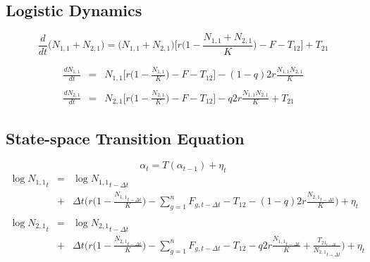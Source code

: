 \documentclass[a4paper,KOMA,landscape,titlepage]{powersem}
\newcommand\None{{N_{1,1}}}
\newcommand\Ntwo{{N_{2,1}}}
\newcommand\Nsum{{N_{1,1}+N_{2,1}}}
\begin{document}
\begin{slide}\section{Logistic Dynamics}
\begin{center}
\begin{equation}
\frac{d}{dt}\big(\Nsum\big)=\big(\Nsum\big)\Big[r\Big(1-\frac{\Nsum}{K}\Big)-F-T_{12}\Big]+T_{21}
\label{eqn:logistic}
\end{equation}
\vspace{2ex}

\begin{eqnarray}
\label{eqn:coupledschaeferq}
\frac{d\None}{dt}&=&\None\Big[r\Big(1-\frac{\None}{K}\Big)
-F - T_{12}\Big] - (1-q)2r\frac{\None\Ntwo}{K}\nonumber\\
\\
\frac{d\Ntwo}{dt}&=&\Ntwo\Big[r\Big(1-\frac{\Ntwo}{K}\Big)
-F - T_{12}\Big] - q2r\frac{\None\Ntwo}{K} + T_{21}\nonumber
\end{eqnarray}
\end{center}
\end{slide}

\begin{slide}\section{State-space Transition Equation}
\begin{center}
\begin{equation}
\alpha_t=T(\alpha_{t-1}) + \eta_t
\end{equation}
\vspace{2ex}
\begin{eqnarray}
\label{eqn:finitecoupledlogschaefer}
\log \None_t &=& \log \None_{t-\Delta t}\nonumber\\ 
             &+&\Delta t\bigg(r\Big(1-\frac{\None_{t-\Delta t}}{K}\Big)
-\sum_{g=1}^n F_{g,t-\Delta t} - T_{12} - (1-q)2r\frac{\Ntwo_{t-\Delta
t}}{K}\bigg)+\eta_t\nonumber\\
\\ \log \Ntwo_t &=& \log \Ntwo_{t-\Delta t}\nonumber\\
             &+&\Delta t\bigg(r\Big(1-\frac{\Ntwo_{t-\Delta t}}{K}\Big)
-\sum_{g=1}^n F_{g,t-\Delta t} - T_{12} - q2r\frac{\None_{t-\Delta t}}{K}
     +\frac{T_{{21}_{t-\Delta t}}}{\Ntwo_{t-\Delta t}}\bigg)+\eta_t\nonumber
\end{eqnarray}
\end{center}
\end{slide}
\end{document}
